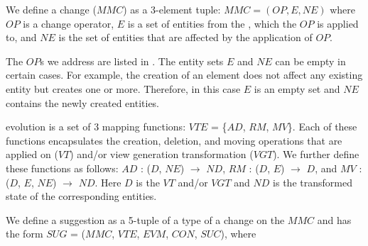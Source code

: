 \begin{definition} 
    We define a \metamodel change ($MMC$) as a 3-element tuple: $MMC = (OP, E, NE)$ where $OP$ is a \metamodel change operator, $E$ is a set of entities from the \metamodel, which the $OP$ is applied to, and $NE$ is the set of entities that are affected by the application of $OP$.
\end{definition}
The $OP$s we address are listed in . The entity sets $E$ and $NE$ can be empty in certain cases. For example, the creation of an element does not affect any existing entity but creates one or more. Therefore, in this case $E$ is an empty set and $NE$ contains the newly created entities.

\begin{definition} 
    \Viewtype evolution is a set of 3 mapping functions: $VTE$ = \{$AD$, $RM$, $MV$\}. Each of these functions encapsulates the creation, deletion, and moving operations that are applied on \viewtype ($VT$) and/or view generation transformation ($VGT$). We further define these functions as follows: $AD$ : ($D$, $NE$) $\rightarrow$ $ND$, $RM$ : ($D$, $E$) $\rightarrow$ $D$, and $MV$ : ($D$, $E$, $NE$) $\rightarrow$ $ND$. Here $D$ is the $VT$ and/or $VGT$ and $ND$ is the transformed state of the corresponding entities. 
\end{definition}

\begin{definition}[Suggestion (v2)]
    We define a suggestion as a 5-tuple of a type of a change on the $MMC$ and has the form $SUG$ = ($MMC$, $VTE$, $EVM$, $CON$, $SUC$), where 
\end{definition}
